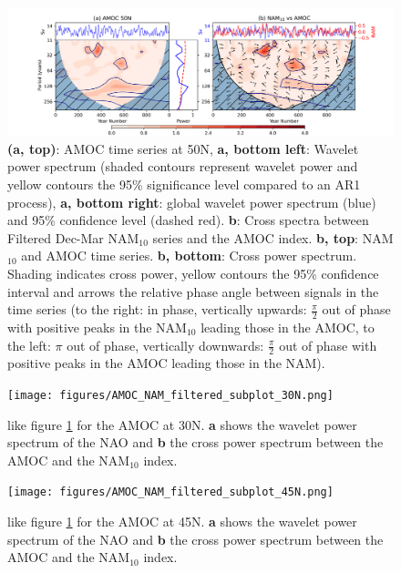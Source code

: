 \begin{center}
\begin{figure}[h!]
\noindent\includegraphics[width = \linewidth]{Figures/Figures-surface/AMOC_NAM_filtered_subplot.png}
\caption{\textbf{(a, top)}: AMOC time series at 50N, \textbf{a, bottom left}: Wavelet power spectrum (shaded contours represent wavelet power and yellow contours the 95\% significance level compared to an AR1 process), \textbf{a, bottom right}: global wavelet power spectrum (blue) and 95\% confidence level (dashed red). \textbf{b}: Cross spectra between Filtered Dec-Mar NAM$_{10}$ series and the AMOC index. \textbf{b, top}: NAM$_{10}$ and AMOC time series. \textbf{b, bottom}: Cross power spectrum. Shading indicates cross power, yellow contours the 95\% confidence interval and arrows the relative phase angle between signals in the time series (to the right: in phase, vertically upwards: $\frac{\pi}{2}$ out of phase with positive peaks in the NAM$_{10}$ leading those in the AMOC, to the left: $\pi$ out of phase, vertically downwards: $\frac{\pi}{2}$ out of phase with positive peaks in the AMOC leading those in the NAM).}
\label{NAM_AMOC_Cross}
\end{figure}
\end{center}

\begin{center}
\begin{figure}[h!]
\noindent\texttt{[image: figures/AMOC\_NAM\_filtered\_subplot\_30N.png]}
\caption{like figure \ref{NAM_AMOC_Cross} for the AMOC at 30N. \textbf{a} shows the wavelet power spectrum of the NAO and \textbf{b} the cross power spectrum between the AMOC and the NAM$_{10}$ index.}
\label{NAM_AMOC_Cross_30}
\end{figure}
\end{center}

\begin{center}
\begin{figure}[h!]
\noindent\texttt{[image: figures/AMOC\_NAM\_filtered\_subplot\_45N.png]}
\caption{like figure \ref{NAM_AMOC_Cross} for the AMOC at 45N. \textbf{a} shows the wavelet power spectrum of the NAO and \textbf{b} the cross power spectrum between the AMOC and the NAM$_{10}$ index.}
\label{NAM_AMOC_Cross_45}
\end{figure}
\end{center}
  
